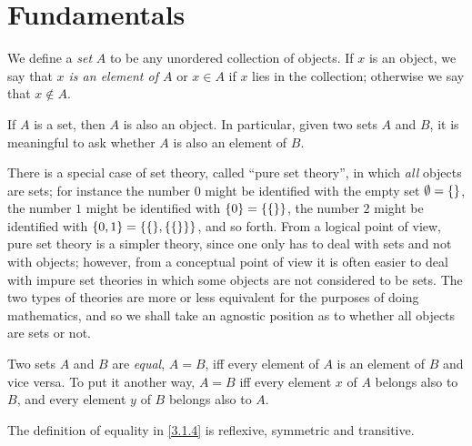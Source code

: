 \section{Fundamentals}\label{sec:3.1}

\begin{defn}\label{3.1.1}
  We define a \emph{set} \(A\) to be any unordered collection of objects.
  If \(x\) is an object, we say that \emph{\(x\) is an element of \(A\)} or \(x \in A\) if \(x\) lies in the collection;
  otherwise we say that \(x \notin A\).
\end{defn}

\begin{ax}\label{3.1}
  If \(A\) is a set, then \(A\) is also an object.
  In particular, given two sets \(A\) and \(B\), it is meaningful to ask whether \(A\) is also an element of \(B\).
\end{ax}

\setcounter{thm}{2}
\begin{rmk}\label{3.1.3}
  There is a special case of set theory, called ``pure set theory'', in which \emph{all} objects are sets;
  for instance the number \(0\) might be identified with the empty set \(\emptyset = \left\lbrace\right\rbrace\), the number \(1\) might be identified with \(\left\lbrace0\right\rbrace = \left\lbrace\left\lbrace\right\rbrace\right\rbrace\), the number \(2\) might be identified with \(\set{0, 1} = \set{\set{}, \set{\set{}}}\), and so forth.
  From a logical point of view, pure set theory is a simpler theory, since one only has to deal with sets and not with objects;
  however, from a conceptual point of view it is often easier to deal with impure set theories in which some objects are not considered to be sets.
  The two types of theories are more or less equivalent for the purposes of doing mathematics, and so we shall take an agnostic position as to whether all objects are sets or not.
\end{rmk}

\begin{defn}\label{3.1.4}
  Two sets \(A\) and \(B\) are \emph{equal}, \(A = B\), iff every element of \(A\) is an element of \(B\) and vice versa.
  To put it another way, \(A = B\) iff every element \(x\) of \(A\) belongs also to \(B\), and every element \(y\) of \(B\) belongs also to \(A\).
\end{defn}

\begin{ac}\label{ac:3.1.1}
  The definition of equality in \cref{3.1.4} is reflexive, symmetric and transitive.
\end{ac}

